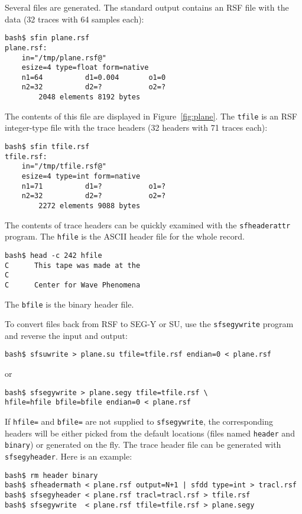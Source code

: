 Several files are generated. The standard output contains an RSF file with the
data (32 traces with 64 samples each):
\begin{verbatim}
bash$ sfin plane.rsf
plane.rsf:
    in="/tmp/plane.rsf@"
    esize=4 type=float form=native
    n1=64          d1=0.004       o1=0
    n2=32          d2=?           o2=?
        2048 elements 8192 bytes
\end{verbatim}
The contents of this file are displayed in Figure~\ref{fig:plane}.
The \texttt{tfile} is an RSF integer-type file with the trace headers (32
headers with 71 traces each):
\begin{verbatim}
bash$ sfin tfile.rsf
tfile.rsf:
    in="/tmp/tfile.rsf@"
    esize=4 type=int form=native
    n1=71          d1=?           o1=?
    n2=32          d2=?           o2=?
        2272 elements 9088 bytes
\end{verbatim}
The contents of trace headers can be quickly examined with the 
\texttt{sfheaderattr} program.
The \texttt{hfile} is the ASCII header file for the whole record.
\begin{verbatim}
bash$ head -c 242 hfile
C      This tape was made at the
C                                                                              
C      Center for Wave Phenomena                         
\end{verbatim}
The  \texttt{bfile} is the binary header file.


To convert files back from RSF to SEG-Y or SU, use the \texttt{sfsegywrite}
program and reverse the input and output:
\begin{verbatim}
bash$ sfsuwrite > plane.su tfile=tfile.rsf endian=0 < plane.rsf
\end{verbatim}
or
\begin{verbatim}
bash$ sfsegywrite > plane.segy tfile=tfile.rsf \
hfile=hfile bfile=bfile endian=0 < plane.rsf
\end{verbatim}

If \texttt{hfile=} and \texttt{bfile=} are not supplied to
\texttt{sfsegywrite}, the corresponding headers will be either picked
from the default locations (files named \texttt{header} and
\texttt{binary}) or generated on the fly. The trace header file can be
generated with \texttt{sfsegyheader}. Here is an example:
\begin{verbatim}
bash$ rm header binary
bash$ sfheadermath < plane.rsf output=N+1 | sfdd type=int > tracl.rsf
bash$ sfsegyheader < plane.rsf tracl=tracl.rsf > tfile.rsf
bash$ sfsegywrite  < plane.rsf tfile=tfile.rsf > plane.segy
\end{verbatim}


